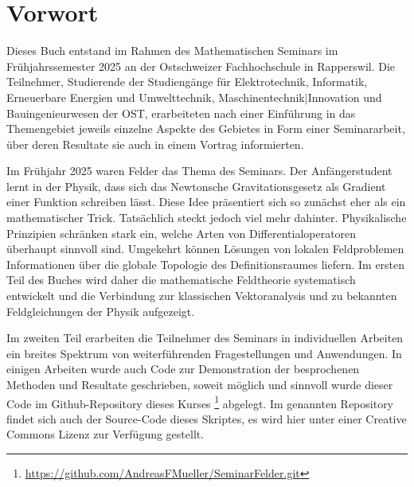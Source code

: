 %
%
%
\chapter*{Vorwort}


Dieses Buch entstand im Rahmen des Mathematischen Seminars
im Frühjahrssemester 2025 an der Ostschweizer Fachhochschule in Rapperswil.
Die Teilnehmer, Studierende der Studiengänge für Elektrotechnik, Informatik,
Erneuerbare Energien und Umwelttechnik, Maschinentechnik$|$Innovation
und Bauingenieurwesen
der OST, erarbeiteten nach einer Einführung in das Themengebiet jeweils
einzelne Aspekte des Gebietes in Form einer Seminararbeit, über
deren Resultate sie auch in einem Vortrag informierten. 

Im Frühjahr 2025 waren Felder das Thema des Seminars.
Der Anfängerstudent lernt in der Physik, dass sich das Newtonsche
Gravitationsgesetz als Gradient einer Funktion schreiben lässt.
Diese Idee präsentiert sich so zunächst eher als ein mathematischer
Trick.
Tatsächlich steckt jedoch viel mehr dahinter.
Physikalische Prinzipien schränken stark ein, welche Arten von
Differentialoperatoren überhaupt sinnvoll sind.
Umgekehrt können Lösungen von lokalen Feldproblemen Informationen
über die globale Topologie des Definitionsraumes liefern.
Im ersten Teil des Buches wird daher die mathematische Feldtheorie
systematisch entwickelt und die Verbindung zur klassischen
Vektoranalysis und zu bekannten Feldgleichungen der Physik aufgezeigt.

Im zweiten Teil erarbeiten die Teilnehmer des Seminars in individuellen
Arbeiten ein breites Spektrum von weiterführenden Fragestellungen
und Anwendungen.
In einigen Arbeiten wurde auch Code zur Demonstration der 
besprochenen Methoden und Resultate geschrieben, soweit
möglich und sinnvoll wurde dieser Code im Github-Repository
%
dieses Kurses%
\footnote{\url{https://github.com/AndreasFMueller/SeminarFelder.git}}
\cite{buch:repo}
abgelegt.
Im genannten Repository findet sich auch der Source-Code dieses
Skriptes, es wird hier unter einer Creative Commons Lizenz
zur Verfügung gestellt.

